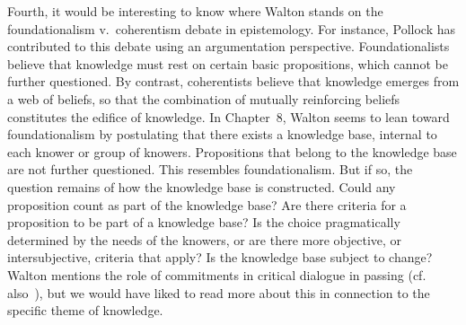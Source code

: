 \documentclass[12pt,a4paper]{article}
\begin{document}

Fourth, it would be interesting to know where Walton stands on the foundationalism v.\ coherentism 
debate in epistemology. For instance, Pollock has contributed to this debate using an argumentation perspective\citep{pollock1986,pollock1995}. Foundationalists believe that knowledge must rest on certain basic propositions, which cannot be further questioned. By contrast, coherentists believe that knowledge emerges from a web of beliefs, so that 
the combination of mutually reinforcing beliefs constitutes 
the edifice of knowledge. In Chapter~8, %
Walton seems to lean toward foundationalism by postulating that there exists a knowledge base, internal to each knower or group of knowers. 
Propositions that belong to the knowledge base are not further questioned.
This resembles foundationalism. But if so, the question remains of how 
the knowledge base is constructed. Could any proposition count as 
part of the knowledge base? Are there criteria for a proposition 
to be part of a knowledge base? Is the choice pragmatically determined 
by the needs of the knowers, or are there more objective, 
or intersubjective, criteria that apply? Is the knowledge base subject to change? Walton mentions the role of commitments in critical dialogue in passing (cf. also~\citealt{waltonKrabbe1995}), but we would have liked to read more about this in connection to the specific theme of knowledge.
\end{document}

